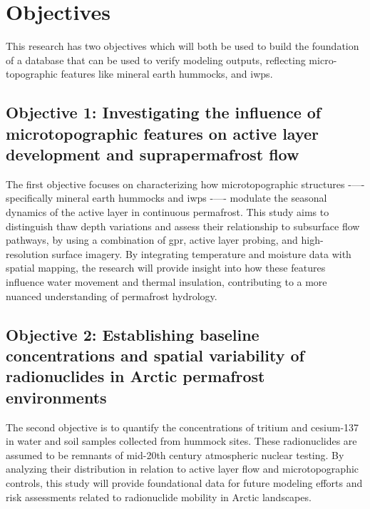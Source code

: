 \chapter{Objectives}
This research has two objectives which will both be used to build the foundation of a database that can be used to verify modeling outputs, reflecting micro-topographic features like mineral earth hummocks, and \glspl{iwp}. 
\section{Objective 1: Investigating the influence of microtopographic features on active layer development and suprapermafrost flow}
The first objective focuses on characterizing how microtopographic structures -—- specifically mineral earth hummocks and \glspl{iwp} -—- modulate the seasonal dynamics of the active layer in continuous permafrost. 
This study aims to distinguish thaw depth variations and assess their relationship to subsurface flow pathways, by using a combination of \gls{gpr}, active layer probing, and high-resolution surface imagery. 
By integrating temperature and moisture data with spatial mapping, the research will provide insight into how these features influence water movement and thermal insulation, contributing to a more nuanced understanding of permafrost hydrology.
\section{Objective 2: Establishing baseline concentrations and spatial variability of radionuclides in Arctic permafrost environments}
The second objective is to quantify the concentrations of tritium and cesium-137 in water and soil samples collected from hummock sites. 
These radionuclides are assumed to be remnants of mid-20th century atmospheric nuclear testing. 
By analyzing their distribution in relation to active layer flow and microtopographic controls, this study will provide foundational data for future modeling efforts and risk assessments related to radionuclide mobility in Arctic landscapes.
